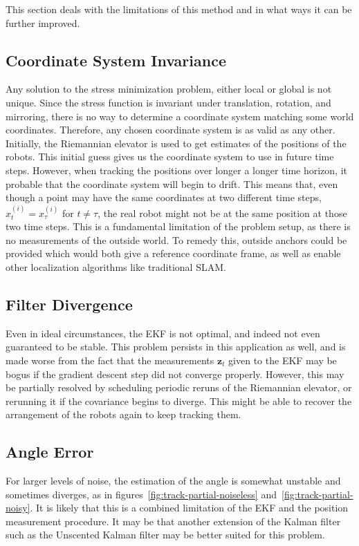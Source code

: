 This section deals with the limitations of this method and in what ways it can be further improved.
\subsection{Coordinate System Invariance}
Any solution to the stress minimization problem, either local or global is not unique. Since the stress function is invariant under translation, rotation, and mirroring, there is no way to determine a coordinate system matching some world coordinates. Therefore, any chosen coordinate system is as valid as any other. Initially, the Riemannian elevator is used to get estimates of the positions of the robots. This initial guess gives us the coordinate system to use in future time steps. However, when tracking the positions over longer a longer time horizon, it probable that the coordinate system will begin to drift. This means that, even though a point may have the same coordinates at two different time steps, $x^{(i)}_t = x^{(i)}_\tau$ for $t \neq \tau$, the real robot might not be at the same position at those two time steps. This is a fundamental limitation of the problem setup, as there is no measurements of the outside world. To remedy this, outside anchors could be provided which would both give a reference coordinate frame, as well as enable other localization algorithms like traditional SLAM. 

\subsection{Filter Divergence}
Even in ideal circumstances, the EKF is not optimal, and indeed not even guaranteed to be stable. This problem persists in this application as well, and is made worse from the fact that the measurements $\mathbf{z}_t$ given to the EKF may be bogus if the gradient descent step did not converge properly. However, this may be partially resolved by scheduling periodic reruns of the Riemannian elevator, or rerunning it if the covariance begins to diverge. This might be able to recover the arrangement of the robots again to keep tracking them.

\subsection{Angle Error}
For larger levels of noise, the estimation of the angle is somewhat unstable and sometimes diverges, as in figures~\ref{fig:track-partial-noiseless} and~\ref{fig:track-partial-noisy}. It is likely that this is a combined limitation of the EKF and the position measurement procedure. It may be that another extension of the Kalman filter such as the Unscented Kalman filter may be better suited for this problem. 